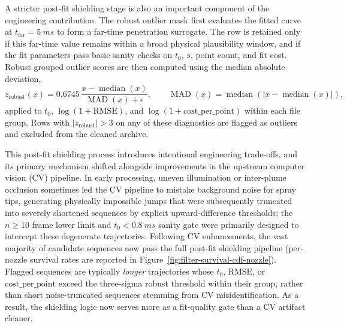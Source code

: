 A stricter post-fit shielding stage is also an important component of the engineering contribution. The robust outlier mask first evaluates the fitted curve at \(t_{\mathrm{far}}=\SI{5}{ms}\) to form a far-time penetration surrogate. The row is retained only if this far-time value remains within a broad physical plausibility window, and if the fit parameters pass basic sanity checks on \(t_0\), \(s\), point count, and fit cost. Robust grouped outlier scores are then computed using the median absolute deviation,
\[
z_{\mathrm{robust}}(x)=0.6745\,\frac{x-\operatorname{median}(x)}{\operatorname{MAD}(x)+\epsilon},
\qquad
\operatorname{MAD}(x)=\operatorname{median}\!\left(\lvert x-\operatorname{median}(x)\rvert\right),
\]
applied to \(t_0\), \(\log(1+\mathrm{RMSE})\), and \(\log(1+\mathrm{cost\_per\_point})\) within each file group. Rows with \(|z_{\mathrm{robust}}|>3\) on any of these diagnostics are flagged as outliers and excluded from the cleaned archive.

This post-fit shielding process introduces intentional engineering trade-offs, and its primary mechanism shifted alongside improvements in the upstream computer vision (CV) pipeline. In early processing, uneven illumination or inter-plume occlusion sometimes led the CV pipeline to mistake background noise for spray tips, generating physically impossible jumps that were subsequently truncated into severely shortened sequences by explicit upward-difference thresholds; the \(n \ge 10\) frame lower limit and \(t_0 < \SI{0.8}{ms}\) sanity gate were primarily designed to intercept these degenerate trajectories. Following CV enhancements, the vast majority of candidate sequences now pass the full post-fit shielding pipeline (per-nozzle survival rates are reported in Figure~\ref{fig:filter-survival-cdf-nozzle}). Flagged sequences are typically \emph{longer} trajectories whose \(t_0\), RMSE, or \(\mathrm{cost\_per\_point}\) exceed the three-sigma robust threshold within their group, rather than short noise-truncated sequences stemming from CV misidentification. As a result, the shielding logic now serves more as a fit-quality gate than a CV artifact cleaner.

